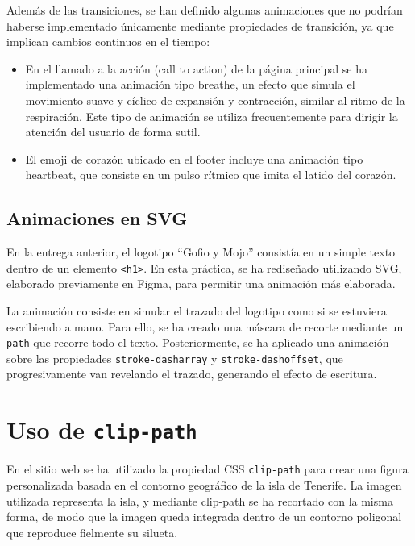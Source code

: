 \documentclass{article}
\begin{document}
Además de las transiciones, se han definido algunas animaciones que no podrían haberse implementado únicamente mediante propiedades de transición, ya que implican cambios continuos en el tiempo:

\begin{itemize}
    \item En el llamado a la acción (call to action) de la página principal se ha implementado una animación tipo breathe, un efecto que simula el movimiento suave y cíclico de expansión y contracción, similar al ritmo de la respiración. Este tipo de animación se utiliza frecuentemente para dirigir la atención del usuario de forma sutil.

    \item El emoji de corazón ubicado en el footer incluye una animación tipo heartbeat, que consiste en un pulso rítmico que imita el latido del corazón.
\end{itemize}

\subsection{Animaciones en SVG}\label{subsec:animaciones-en-svg}

En la entrega anterior, el logotipo ``Gofio y Mojo'' consistía en un simple texto dentro de un elemento \texttt{<h1>}. En esta práctica, se ha rediseñado utilizando SVG, elaborado previamente en Figma, para permitir una animación más elaborada.

La animación consiste en simular el trazado del logotipo como si se estuviera escribiendo a mano. Para ello, se ha creado una máscara de recorte mediante un \texttt{path} que recorre todo el texto. Posteriormente, se ha aplicado una animación sobre las propiedades \texttt{stroke-dasharray} y \texttt{stroke-dashoffset}, que progresivamente van revelando el trazado, generando el efecto de escritura.

\section{Uso de \texttt{clip-path}}\label{sec:uso-de-clip-path}

En el sitio web se ha utilizado la propiedad CSS \texttt{clip-path} para crear una figura personalizada basada en el contorno geográfico de la isla de Tenerife. La imagen utilizada representa la isla, y mediante clip-path se ha recortado con la misma forma, de modo que la imagen queda integrada dentro de un contorno poligonal que reproduce fielmente su silueta.
\end{document}
